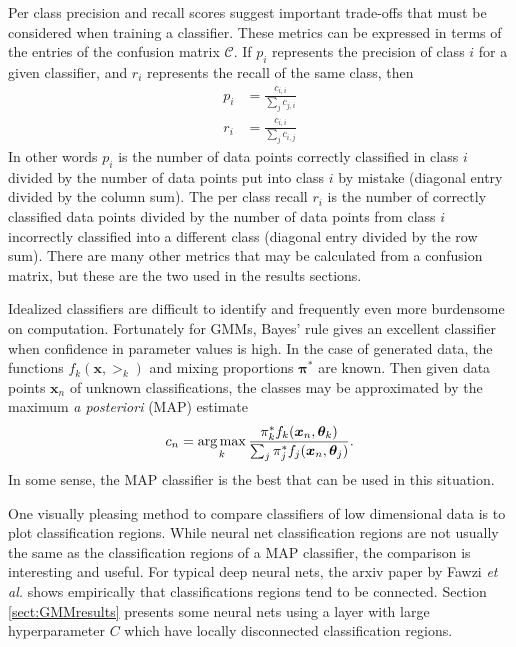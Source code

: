 Per class precision and recall scores suggest important trade-offs that must be considered when training a classifier. These metrics can be expressed in terms of the entries of the confusion matrix \( \mathcal{C} \). If \( p_i \) represents the precision of class \( i \) for a given classifier, and \( r_i \) represents the recall of the same class, then 
\begin{align}
p_i &= \frac{c_{i,i}}{\sum_{j} c_{j,i}}\\
r_i &= \frac{c_{i,i}}{\sum_{j} c_{i,j}}
\end{align}
In other words \( p_i \) is the number of data points correctly classified in class \( i \) divided by the number of data points put into class \( i \) by mistake (diagonal entry divided by the column sum). The per class recall \( r_i \) is the number of correctly classified data points divided by the number of data points from class \( i \) incorrectly classified into a different class (diagonal entry divided by the row sum).  There are many other metrics that may be calculated from a confusion matrix, but these are the two used in the results sections.

Idealized classifiers are difficult to identify and frequently even more burdensome on computation.  Fortunately for GMMs, Bayes' rule gives an excellent classifier when confidence in parameter values is high. In the case of generated data, the functions \( f_k(\bm x,\bm\gt_k) \) and mixing proportions \( \bm\pi^{\ast} \) are known. Then given data points \( \bm x_n \) of unknown classifications, the classes may be approximated by the maximum \textit{a posteriori} (MAP) estimate
\begin{equation}\label{eqn:MAPestimator}
c_n = \operatorname*{arg\,max}_k \frac{\pi_k^{\ast}f_k(\bm x_n,\bm{\theta}_k)}{\sum_j \pi_j^{\ast}f_j(\bm x_n,\bm{\theta}_j)}. 
\end{equation}
In some sense, the MAP classifier is the best that can be used in this situation.

One visually pleasing method to compare classifiers of low dimensional data is to plot classification regions. While neural net classification regions are not usually the same as the classification regions of a MAP classifier, the comparison is interesting and useful. For typical deep neural nets, the arxiv paper by Fawzi \textit{et al.} \cite{fawzi2017classification} shows empirically that classifications regions tend to be connected.  Section \ref{sect:GMMresults} presents some neural nets using a \RS layer with large hyperparameter \( C \) which have locally disconnected classification regions.

